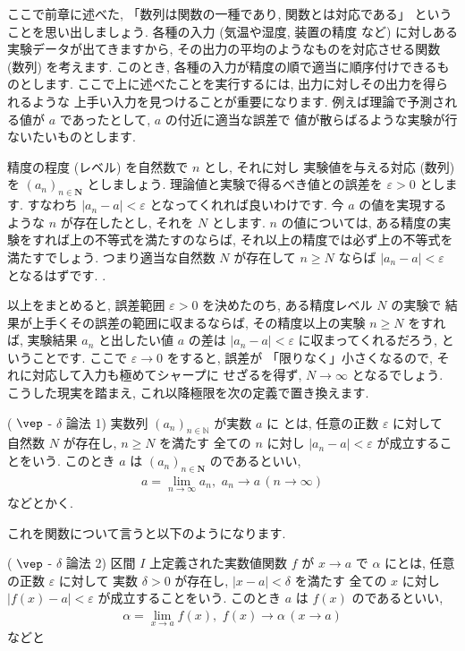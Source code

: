 \documentclass[openany, a4paper, oneside]{jsbook}
\begin{document}
ここで前章に述べた, 「数列は関数の一種であり, 関数とは対応である」
ということを思い出しましょう.
各種の入力 (気温や湿度, 装置の精度
など) に対しある実験データが出てきますから, その出力の平均のようなものを対応させる関数 (数列) を考えます.
このとき, 各種の入力が精度の順で適当に順序付けできるものとします.
ここで上に述べたことを実行するには, 出力に対しその出力を得られるような
上手い入力を見つけることが重要になります.
例えば理論で予測される値が $a$ であったとして,
 $a$ の付近に適当な誤差で
値が散らばるような実験が行ないたいものとします.

精度の程度 (レベル) を自然数で $n$ とし, それに対し
実験値を与える対応 (数列) を $(a_n)_{n \in \bm{N}}$ としましょう.
理論値と実験で得るべき値との誤差を $\varepsilon >0$ とします. すなわち
 $|a_n -a| < \varepsilon$ となってくれれば良いわけです.
今 $a$ の値を実現するような $n$ が存在したとし, それを $N$ とします.
 $n$ の値については, ある精度の実験をすれば上の不等式を満たすのならば,
それ以上の精度では必ず上の不等式を満たすでしょう.
つまり適当な自然数 $N$ が存在して $n \geq N$ ならば
 $|a_n -a|<\varepsilon$ となるはずです. .

以上をまとめると,
誤差範囲 $\varepsilon >0$ を決めたのち, ある精度レベル $N$ の実験で
結果が上手くその誤差の範囲に収まるならば,
その精度以上の実験 $n \geq N$ をすれば, 実験結果 $a_n$ と出したい値 $a$
の差は $|a_n -a| < \varepsilon$ に収まってくれるだろう,
ということです.
ここで $\varepsilon \to 0$ をすると, 誤差が
「限りなく」小さくなるので, それに対応して入力も極めてシャープに
せざるを得ず,  $N \to \infty$ となるでしょう.
こうした現実を踏まえ, これ以降極限を次の定義で置き換えます.
\begin{defn}( $\vep$ - $\delta$ 論法 1)
実数列 $(a_n)_{n \in \mathbb{N}}$ が実数 $a$ に
とは, 任意の正数 $\varepsilon$ に対して
自然数 $N$ が存在し,  $n\geq N$ を満たす
全ての $n$ に対し $|a_n-a|<\varepsilon$ が成立することをいう.
このとき $a$ は $(a_n)_{n \in \bm{N}}$ のであるといい,
\begin{align}
    a = \lim_{n \to \infty}a_n ,\,\, a_n \to a \, (n \to \infty)
\end{align}
などとかく.
\end{defn}

これを関数について言うと以下のようになります.
\begin{defn}( $\vep$ - $\delta$ 論法 2)
区間 $I$ 上定義された実数値関数 $f$ が $x \to a$
で $\alpha$ にとは, 任意の正数 $\varepsilon$ に対して
実数 $\delta >0$ が存在し,  $|x-a|<\delta$ を満たす
全ての $x$ に対し $|f (x)-a|<\varepsilon$ が成立することをいう.
このとき $a$ は $f (x)$ のであるといい,
\begin{align}
    \alpha = \lim_{x \to a}f (x) ,\,\, f (x) \to \alpha \, (x \to a)
\end{align}
などと
\end{defn}
\end{document}
